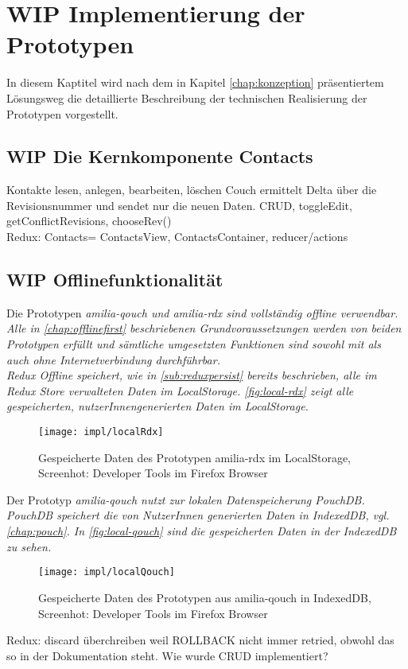 \chapter{\label{chap:implementierung}WIP Implementierung der Prototypen}
In diesem Kaptitel wird nach dem in Kapitel \ref{chap:konzeption} präsentiertem Lösungsweg die detaillierte Beschreibung der technischen Realisierung der Prototypen vorgestellt.\\
%
%
%
\section{WIP Die Kernkomponente Contacts}

Kontakte lesen, anlegen, bearbeiten, löschen
Couch ermittelt Delta über die Revisionsnummer und sendet nur die neuen Daten.
CRUD, toggleEdit, getConflictRevisions, chooseRev()\\
Redux: Contacts= ContactsView, ContactsContainer, reducer/actions
%
%
%
\section{WIP Offlinefunktionalität}
Die Prototypen \it{amilia-qouch} und \it{amilia-rdx} sind vollständig offline verwendbar.
Alle in \autoref{chap:offlinefirst} beschriebenen Grundvoraussetzungen werden von beiden Prototypen erfüllt und sämtliche umgesetzten Funktionen sind sowohl mit als auch ohne Internetverbindung durchführbar.
%
%
\\
Redux Offline speichert, wie in \autoref{sub:reduxpersist} bereits beschrieben, alle im Redux Store verwalteten Daten im LocalStorage. \autoref{fig:local-rdx} zeigt alle gespeicherten, nutzerInnengenerierten Daten im LocalStorage.
%
\begin{figure}[H]
  \centering
  \texttt{[image: impl/localRdx]}
  \grayRule
  \caption[Gespeicherte Daten im LocalStorage]{Gespeicherte Daten des Prototypen amilia-rdx im LocalStorage,\\Screenhot: Developer Tools im Firefox Browser}
  \label{fig:local-rdx}
\end{figure}
% 
Der Prototyp \it{amilia-qouch} nutzt zur lokalen Datenspeicherung PouchDB. PouchDB speichert die von NutzerInnen generierten Daten in IndexedDB, vgl. \autoref{chap:pouch}. In \autoref{fig:local-qouch} sind die gespeicherten Daten in der IndexedDB zu sehen.
%
\begin{figure}[H]
  \centering
  \texttt{[image: impl/localQouch]}
  \grayRule
  \caption[Gespeicherte Daten in IndexedDB]{Gespeicherte Daten des Prototypen aus amilia-qouch in IndexedDB,\\Screenhot: Developer Tools im Firefox Browser}
  \label{fig:local-qouch}
\end{figure}
%
%
Redux: discard überchreiben weil ROLLBACK nicht immer retried, obwohl das so in der Dokumentation steht.
Wie wurde CRUD implementiert?\\
%
%
%
